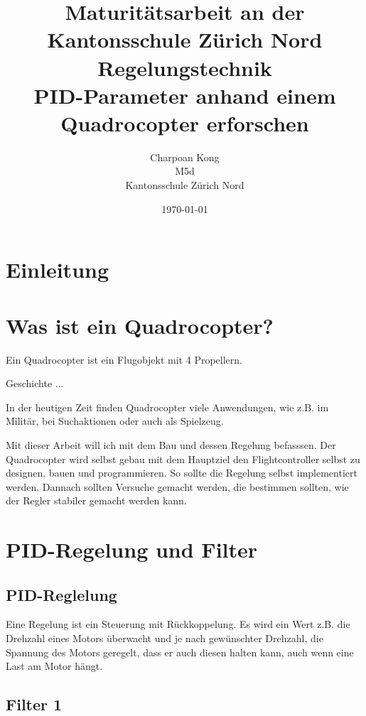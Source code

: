 \documentclass[12pt,a4paper, ngerman]{article}
\begin{document}

\title{\large Maturitätsarbeit an der Kantonsschule Zürich Nord \\ \Huge Regelungstechnik \\ \huge PID-Parameter anhand einem Quadrocopter erforschen}
\date{\today}
\author{Charpoan Kong \\ M5d \\ Kantonsschule Zürich Nord}
\maketitle
{}

\newpage
\clearpage
{}
\tableofcontents
\newpage
{}

\section{Einleitung}

\newpage
\section{Was ist ein Quadrocopter?}
Ein Quadrocopter ist ein Flugobjekt mit 4 Propellern. 

Geschichte ... 

In der heutigen Zeit finden Quadrocopter viele Anwendungen, wie z.B. im Militär, bei Suchaktionen oder auch als Spielzeug.

Mit dieser Arbeit will ich mit dem Bau und dessen Regelung befasssen. Der Quadrocopter wird selbst gebau mit dem Hauptziel den Flightcontroller selbst zu designen, bauen und programmieren. So sollte die Regelung selbst implementiert werden. Dannach sollten Versuche gemacht werden, die bestimmen sollten, wie der Regler stabiler gemacht werden kann.

\section{PID-Regelung und Filter}
\subsection{PID-Reglelung}
Eine Regelung ist ein Steuerung mit Rückkoppelung. Es wird ein Wert z.B. die Drehzahl eines Motors überwacht und je nach gewünschter Drehzahl, die Spannung des Motors geregelt, dass er auch diesen halten kann, auch wenn eine Last am Motor hängt.    

\subsection{Filter 1}
\end{document}
